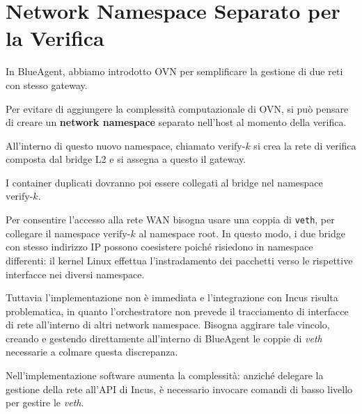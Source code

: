 \section{Network Namespace Separato per la
Verifica}\label{network-namespace-separato-per-la-verifica}

In BlueAgent, abbiamo introdotto OVN per semplificare la gestione di due
reti con stesso gateway.

Per evitare di aggiungere la complessità computazionale di OVN, si può
pensare di creare un \textbf{network namespace} separato nell'host al
momento della verifica.

All'interno di questo nuovo namespace, chiamato \(\text{verify-}k\) si
crea la rete di verifica composta dal bridge L2 e si assegna a questo il
gateway.

I container duplicati dovranno poi essere collegati al bridge nel
namespace \(\text{verify-}k\).

Per consentire l'accesso alla rete WAN bisogna usare una coppia di
\passthrough{\lstinline!veth!}, per collegare il namespace
\(\text{verify-}k\) al namespace root. In questo modo, i due bridge con
stesso indirizzo IP possono coesistere poiché risiedono in namespace
differenti: il kernel Linux effettua l'instradamento dei pacchetti verso
le rispettive interfacce nei diversi namespace.

Tuttavia l'implementazione non è immediata e l'integrazione con Incus
risulta problematica, in quanto l'orchestratore non prevede il
tracciamento di interfacce di rete all'interno di altri network
namespace. Bisogna aggirare tale vincolo, creando e gestendo
direttamente all'interno di BlueAgent le coppie di \emph{veth}
necessarie a colmare questa discrepanza.

Nell'implementazione software aumenta la complessità: anziché delegare
la gestione della rete all'API di Incus, è necessario invocare comandi
di basso livello per gestire le \emph{veth}.
